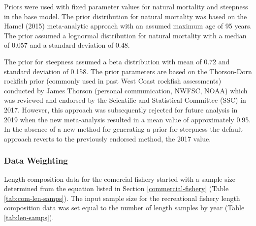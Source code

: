 \documentclass[11pt,
  english,
  a4paper,
]{article}
\begin{document}
\leavevmode\tagmcend\tagstructend


Priors were used with fixed parameter values for natural mortality and steepness in the base model. The prior distribution for natural mortality was based on the Hamel {(2015)\leavevmode\tagmcend\tagstructend} meta-analytic approach with an assumed maximum age of 95 years. The prior assumed a lognormal distribution for natural mortality with a median of 0.057 and a standard deviation of 0.48.

\leavevmode\tagmcend\tagstructend\par


The prior for steepness assumed a beta distribution with mean of 0.72 and standard deviation of 0.158. The prior parameters are based on the Thorson-Dorn rockfish prior (commonly used in past West Coast rockfish assessments) conducted by James Thorson (personal communication, NWFSC, NOAA) which was reviewed and endorsed by the Scientific and Statistical Committee (SSC) in 2017. However, this approach was subsequently rejected for future analysis in 2019 when the new meta-analysis resulted in a mean value of approximately 0.95. In the absence of a new method for generating a prior for steepness the default approach reverts to the previously endorsed method, the 2017 value.

\leavevmode\tagmcend\tagstructend\par


\hypertarget{data-weighting}{%
\subsubsection{Data Weighting}\label{data-weighting}}

\leavevmode\tagmcend\tagstructend


Length composition data for the comercial fishery started with a sample size determined from the equation listed in Section \ref{commercial-fishery} (Table \ref{tab:com-len-samps}). The input sample size for the recreational fishery length composition data was set equal to the number of length samples by year (Table \ref{tab:len-samps}).
\end{document}
